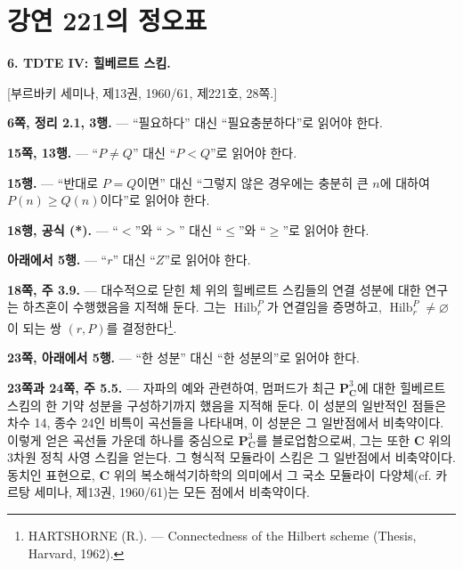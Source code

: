 \clearpage
\chapter*{강연 221의 정오표}
\setcounter{footnote}{3}

\noindent\textbf{6. TDTE IV: 힐베르트 스킴.}

\begin{center}
[부르바키 세미나, 제13권, 1960/61, 제221호, 28쪽.]
\end{center}

\noindent\textbf{6쪽, 정리 2.1, 3행.} --- ``필요하다'' 대신
``필요충분하다''로 읽어야 한다.

\noindent\textbf{15쪽, 13행.} --- ``$P\neq Q$'' 대신
``$P<Q$''로 읽어야 한다.

\noindent\textbf{15행.} --- ``반대로 $P=Q$이면'' 대신
``그렇지 않은 경우에는 충분히 큰 $n$에 대하여 $P(n)\geq Q(n)$이다''로
읽어야 한다.

\noindent\textbf{18행, 공식 (*).} --- ``$<$''와 ``$>$'' 대신
``$\leq$''와 ``$\geq$''로 읽어야 한다.

\noindent\textbf{아래에서 5행.} --- ``$r$'' 대신 ``$Z$''로
읽어야 한다.

\noindent\textbf{18쪽, 주 3.9.} --- 대수적으로 닫힌 체 위의 힐베르트
스킴들의 연결 성분에 대한 연구는 하츠혼이 수행했음을 지적해 둔다. 그는
$\operatorname{Hilb}^{P}_{r}$가 연결임을 증명하고,
$\operatorname{Hilb}^{P}_{r}\neq\varnothing$이 되는 쌍 $(r,P)$를
결정한다\footnote{HARTSHORNE (R.). --- Connectedness of the Hilbert
scheme (Thesis, Harvard, 1962).}.

\noindent\textbf{23쪽, 아래에서 5행.} --- ``한 성분'' 대신
``한 성분의''로 읽어야 한다.

\noindent\textbf{23쪽과 24쪽, 주 5.5.} --- 자파의 예와 관련하여,
멈퍼드가 최근 $\mathbf P^3_{\mathbf C}$에 대한 힐베르트 스킴의 한 기약
성분을 구성하기까지 했음을 지적해 둔다. 이 성분의 일반적인 점들은 차수
14, 종수 24인 비특이 곡선들을 나타내며, 이 성분은 그 일반점에서
비축약이다. 이렇게 얻은 곡선들 가운데 하나를 중심으로
$\mathbf P^3_{\mathbf C}$를 블로업함으로써, 그는 또한 $\mathbf C$ 위의
3차원 정칙 사영 스킴을 얻는다. 그 형식적 모듈라이 스킴은
그 일반점에서 비축약이다. 동치인 표현으로, $\mathbf C$ 위의
복소해석기하학의 의미에서 그 국소 모듈라이 다양체(cf. 카르탕 세미나,
제13권, 1960/61)는 모든 점에서 비축약이다.
